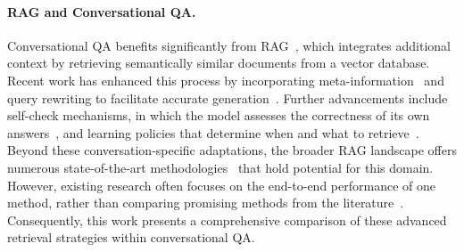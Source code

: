 \documentclass[11pt]{article}
\begin{document}
\paragraph{RAG and Conversational QA.}
Conversational QA benefits significantly from RAG~\cite{lewis_retrievalaugmented_2020}, which integrates additional context by retrieving semantically similar documents from a vector database. 
Recent work has enhanced this process by incorporating meta-information~\cite{saharoy_evidence_2025} and query rewriting to facilitate accurate generation~\cite{mo_convgqr_2023}. Further advancements include self-check mechanisms, in which the model assesses the correctness of its own answers~\cite{ye_boosting_2024}, and learning policies that determine when and what to retrieve~\cite{roy_learning_2024}.
Beyond these conversation-specific adaptations, the broader RAG landscape offers numerous state-of-the-art methodologies~\cite{gao_retrievalaugmented_2023, huang_survey_2024} that hold potential for this domain. However, existing research often focuses on the end-to-end performance of one method, rather than comparing promising methods from the literature~\cite{gao_complement_2021, tito_document_2021, gao_precise_2023}. Consequently, this work presents a comprehensive comparison of these advanced retrieval strategies within conversational QA.


\end{document}
